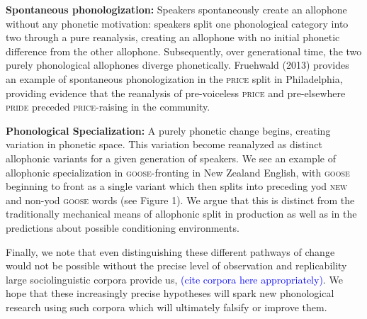 \documentclass[a4paper,aps,prl,12pt,tightenlines,superscriptaddress]{revtex4}
\begin{document}
\textbf{Spontaneous phonologization:} Speakers spontaneously create an allophone without any phonetic motivation: speakers split one phonological category into two through a pure reanalysis, creating an allophone with no initial phonetic difference from the other allophone. Subsequently, over generational time, the two purely phonological allophones diverge phonetically. Fruehwald (2013) provides an example of spontaneous phonologization in the \textsc{price} split in Philadelphia, providing evidence that the reanalysis of pre-voiceless \textsc{price} and pre-elsewhere \textsc{pride} preceded \textsc{price}-raising in the community.

\textbf{Phonological Specialization:} %
A purely phonetic change begins, creating variation in phonetic space. This variation become reanalyzed as distinct allophonic variants for a given generation of speakers. We see an example of allophonic specialization in \textsc{goose}-fronting in New Zealand English, with \textsc{goose} beginning to front as a single variant which then splits into preceding yod \textsc{new} and non-yod \textsc{goose} words (see Figure 1). We argue that this is distinct from the traditionally mechanical means of allophonic split in production as well as in the predictions about possible conditioning environments.

Finally, we note that even distinguishing these different pathways of change would not be possible without the precise level of observation and replicability large sociolinguistic corpora provide us, \textcolor{blue}{(cite corpora here appropriately)}. We hope that these increasingly precise hypotheses will spark new phonological research using such corpora which will ultimately falsify or improve them.
\end{document}
